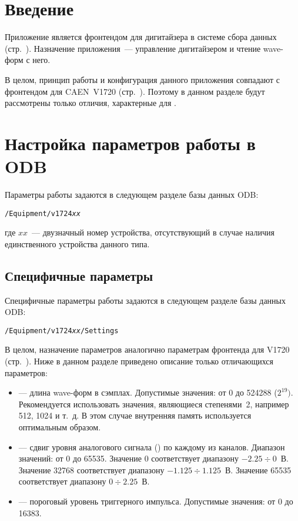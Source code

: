 \section{Введение}

Приложение \FE{} является фронтендом для дигитайзера \DEVICE{} в системе сбора данных \MIDAS{} (стр.~\pageref{sec-midas-frontend}). Назначение приложения~--- управление дигитайзером и чтение wave-форм с него.

В целом, принцип работы и конфигурация данного приложения совпадают с фронтендом для CAEN~V1720 (стр.~\pageref{sec-fe-v1720}). Поэтому в данном разделе будут рассмотрены только отличия, характерные для \DEVICE{}.

\section{Настройка параметров работы в ODB}

Параметры работы \DEVICE{} задаются в следующем разделе базы данных ODB:

\medskip

{\tt /Equipment/v1724{\it xx}}

\medskip

\noindent где $xx$~--- двузначный номер устройства, отсутствующий в случае наличия единственного устройства данного типа.

\subsection{Специфичные параметры}

Специфичные параметры работы \DEVICE{} задаются в следующем разделе базы данных ODB:

\medskip

{\tt /Equipment/v1724{\it xx}/Settings}

\medskip

В целом, назначение параметров аналогично параметрам фронтенда для V1720 (стр.~\pageref{sec-v1720-specific-params}). Ниже в данном разделе приведено описание только отличающихся параметров:

\begin{itemize}

\item {} --- длина wave-форм в сэмплах. Допустимые значения: от 0 до 524288 ($2^{19})$. Рекомендуется использовать значения, являющиеся степенями~2, например 512, 1024 и т.~д. В этом случае внутренняя память \DEVICE{} используется оптимальным образом.

\item {} --- сдвиг уровня аналогового сигнала () \cite{CaenUM3248AIS} по каждому из каналов. Диапазон значений: от 0 до 65535. Значение 0 соответствует диапазону $-2.25 \div 0$~В. Значение 32768 соответствует диапазону $-1.125 \div 1.125$~В. Значение 65535 соответствует диапазону $0 \div 2.25$~В. 

\item {} --- пороговый уровень триггерного импульса. Допустимые значения: от 0 до 16383.

\end{itemize}

